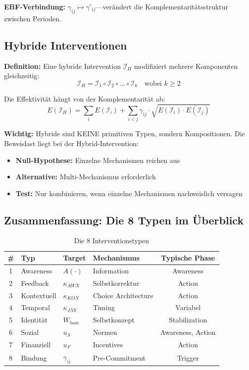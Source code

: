 \textbf{EBF-Verbindung:} $\gamma_{ij} \mapsto \gamma'_{ij}$---verändert die Komplementaritätsstruktur zwischen Perioden.


\subsection{Hybride Interventionen}
\label{sec:17-type-hybrid}

\textbf{Definition:} Eine hybride Intervention $\mathcal{I}_H$ modifiziert mehrere Komponenten gleichzeitig:
\begin{equation}
\mathcal{I}_H = \mathcal{I}_1 \circ \mathcal{I}_2 \circ \ldots \circ \mathcal{I}_k \quad \text{wobei } k \geq 2
\end{equation}

Die Effektivität hängt von der Komplementarität ab:
\begin{equation}
E(\mathcal{I}_H) = \sum_{i} E(\mathcal{I}_i) + \sum_{i < j} \gamma_{ij} \cdot \sqrt{E(\mathcal{I}_i) \cdot E(\mathcal{I}_j)}
\end{equation}

\textbf{Wichtig:} Hybride sind KEINE primitiven Typen, sondern Kompositionen. Die Beweislast liegt bei der Hybrid-Intervention:
\begin{itemize}[nosep]
\item \textbf{Null-Hypothese:} Einzelne Mechanismen reichen aus
\item \textbf{Alternative:} Multi-Mechanismus erforderlich
\item \textbf{Test:} Nur kombinieren, wenn einzelne Mechanismen nachweislich versagen
\end{itemize}


\subsection{Zusammenfassung: Die 8 Typen im Überblick}

\begin{table}[htbp]
\centering
\caption{Die 8 Interventionstypen}
\label{tab:17-types-summary}
\renewcommand{\arraystretch}{1.3}
\small
\begin{tabular}{@{}clllc@{}}
\toprule
\textbf{\#} & \textbf{Typ} & \textbf{Target} & \textbf{Mechanismus} & \textbf{Typische Phase} \\
\midrule
1 & Awareness & $A(\cdot)$ & Information & Awareness \\
2 & Feedback & $\kappa_{AWX}$ & Selbstkorrektur & Action \\
3 & Kontextuell & $\kappa_{KON}$ & Choice Architecture & Action \\
4 & Temporal & $\kappa_{JNY}$ & Timing & Variabel \\
5 & Identität & $W_{\text{base}}$ & Selbstkonzept & Stabilization \\
6 & Sozial & $u_S$ & Normen & Awareness, Action \\
7 & Finanziell & $u_F$ & Incentives & Action \\
8 & Bindung & $\gamma_{ij}$ & Pre-Commitment & Trigger \\
\bottomrule
\end{tabular}
\end{table}


